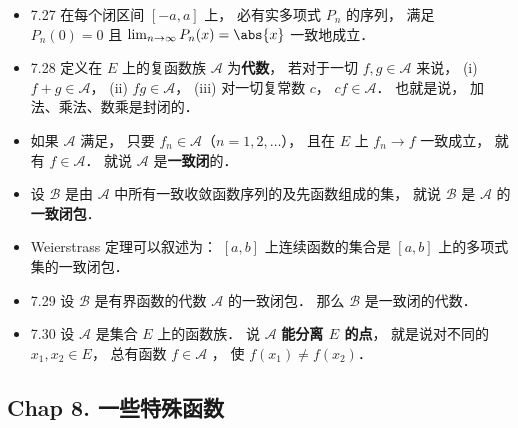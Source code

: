 \begin{itemize}
\item 7.27 在每个闭区间 $[-a,a]$ 上， 必有实多项式 $P_n$ 的序列， 满足 $P_n(0) = 0$ 且 $\lim_{n\to\infty} P_n(x) = \abs{x}$ 一致地成立．

\item 7.28 定义在 $E$ 上的复函数族 $\mathscr A$ 为\textbf{代数}， 若对于一切 $f,g\in \mathscr A$ 来说， (i) $f+g\in \mathscr A$， (ii) $fg\in \mathscr A$， (iii) 对一切复常数 $c$， $cf\in \mathscr A$． 也就是说， 加法、乘法、数乘是封闭的．

\item 如果 $\mathscr A$ 满足， 只要 $f_n\in \mathscr A$（$n=1,2,\dots$）， 且在 $E$ 上 $f_n\to f$ 一致成立， 就有 $f\in \mathscr A$． 就说 $\mathscr A$ 是\textbf{一致闭}的．

\item 设 $\mathscr B$ 是由 $\mathscr A$ 中所有一致收敛函数序列的及先函数组成的集， 就说 $\mathscr B$ 是 $\mathscr A$ 的\textbf{一致闭包}．

\item Weierstrass 定理可以叙述为： $[a,b]$ 上连续函数的集合是 $[a,b]$ 上的多项式集的一致闭包．

\item 7.29 设 $\mathscr B$ 是有界函数的代数 $\mathscr A$ 的一致闭包． 那么 $\mathscr B$ 是一致闭的代数．

\item 7.30 设 $\mathscr A$ 是集合 $E$ 上的函数族． 说 $\mathscr A$ \textbf{能分离 $E$ 的点}， 就是说对不同的 $x_1,x_2\in E$， 总有函数 $f\in \mathscr A$ ， 使 $f(x_1)\ne f(x_2)$．
\end{itemize}


\subsection{Chap 8. 一些特殊函数}

